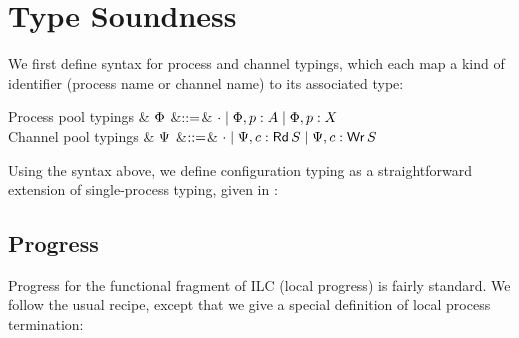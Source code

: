 \section{Type Soundness}
\label{sec:ilcproofs}

We first define syntax for process and channel typings, which each map a kind of
identifier (process name or channel name) to its associated type:

\begin{grammar}
    Process pool typings
    & $\Phi$
    &$\mathrel{::=}$& $\cdot \mathrel{\mid} \Phi,p: A \mathrel{\mid} \Phi,p: X$
    \\
    Channel pool typings
    & $\Psi$
    &$\mathrel{::=}$& $\cdot \mathrel{\mid} \Psi,c:\textnormal{\textsf{Rd}}\,S \mathrel{\mid} \Psi,c:\textnormal{\textsf{Wr}}\,S$
\end{grammar}


Using the syntax above, we define configuration typing as a straightforward extension
of single-process typing, given in :\smallskip


\subsection{Progress}
\label{subsec:label}

Progress for the functional fragment of ILC (local progress) is fairly
standard. We follow the usual recipe, except that we give a special definition
of local process termination:\smallskip


